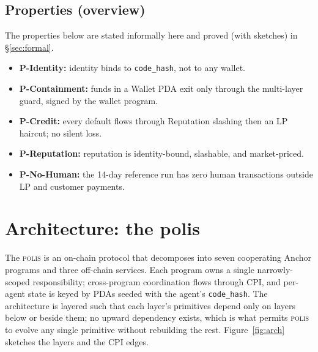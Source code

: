 \documentclass[10pt,conference,letterpaper]{IEEEtran}
\theoremstyle{definition}
\newcommand{\polis}{\textsc{polis}\xspace}
\newcommand{\codehash}{\texttt{code\_hash}}
\begin{document}
\subsection{Properties (overview)}

The properties below are stated informally here and proved (with
sketches) in \S\ref{sec:formal}.

\begin{itemize}
\item \textbf{P-Identity:} identity binds to \codehash, not to any
wallet.
\item \textbf{P-Containment:} funds in a Wallet PDA exit only through
the multi-layer guard, signed by the wallet program.
\item \textbf{P-Credit:} every default flows through Reputation
slashing then an LP haircut; no silent loss.
\item \textbf{P-Reputation:} reputation is identity-bound, slashable,
and market-priced.
\item \textbf{P-No-Human:} the 14-day reference run has zero human
transactions outside LP and customer payments.
\end{itemize}

\section{Architecture: the polis}\label{sec:architecture}

The \polis is an on-chain protocol that decomposes into seven
cooperating Anchor programs and three off-chain services. Each program
owns a single narrowly-scoped responsibility; cross-program coordination
flows through CPI, and per-agent state is keyed by PDAs seeded with the
agent's \codehash. The architecture is layered such that each layer's
primitives depend only on layers below or beside them; no upward
dependency exists, which is what permits \polis to evolve any single
primitive without rebuilding the rest. Figure~\ref{fig:arch} sketches
the layers and the CPI edges.
\end{document}
